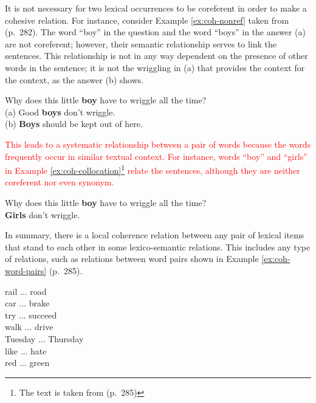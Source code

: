 It is not necessary for two lexical occurrences to be coreferent in order to make a cohesive relation.  
For instance, consider Example \ref{ex:coh-nonref} taken from (p.~282). 
The word ``boy'' in the question and the word ``boys'' in the answer (a) are not coreferent; however, their semantic relationship serves to link the sentences. 
This relationship is not in any way dependent on the presence of other words in the sentence; it is not the wriggling in (a) that provides the context for the context, as the answer (b) shows. 

\begin{examples}
	\label{ex:coh-nonref}
	Why does this little \textbf{boy} have to wriggle all the time? \\
	(a) Good \textbf{boys} don't wriggle. \\
	(b) \textbf{Boys} should be kept out of here. \\
\end{examples} 

\textcolor{red}{
This leads to a systematic relationship between a pair of words because the words frequently occur in similar textual context. 
For instance, words ``boy'' and ``girls'' in Example \ref{ex:coh-collocation}\footnote{The text is taken from \cite{halliday76}(p.~285)} relate the sentences, although they are neither coreferent nor even synonym. 
}
\begin{examples}
	\label{ex:coh-collocation}
	Why does this little \textbf{boy} have to wriggle all the time? \\
	\textbf{Girls} don't wriggle. 
\end{examples}

In summary, there is a local coherence relation between any pair of lexical items that stand to each other in some lexico-semantic relations. 
This includes any type of relations, such as relations between word pairs shown in Example \ref{ex:coh-word-pairs} \cite{halliday76} (p.~285). 

\begin{examples}
	\label{ex:coh-word-pairs}
	rail ... road \\
	car ... brake \\
	try ... succeed \\
	walk ... drive \\
	Tuesday ... Thursday \\
	like ... hate \\
	red ... green 
\end{examples}

